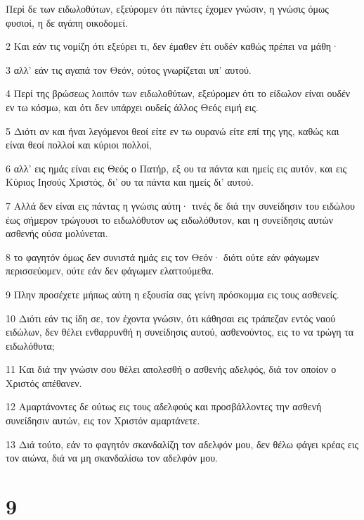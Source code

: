 \par Περί δε των ειδωλοθύτων, εξεύρομεν ότι πάντες έχομεν γνώσιν, η γνώσις όμως φυσιοί, η δε αγάπη οικοδομεί.
\par 2 Και εάν τις νομίζη ότι εξεύρει τι, δεν έμαθεν έτι ουδέν καθώς πρέπει να μάθη·
\par 3 αλλ' εάν τις αγαπά τον Θεόν, ούτος γνωρίζεται υπ' αυτού.
\par 4 Περί της βρώσεως λοιπόν των ειδωλοθύτων, εξεύρομεν ότι το είδωλον είναι ουδέν εν τω κόσμω, και ότι δεν υπάρχει ουδείς άλλος Θεός ειμή εις.
\par 5 Διότι αν και ήναι λεγόμενοι θεοί είτε εν τω ουρανώ είτε επί της γης, καθώς και είναι θεοί πολλοί και κύριοι πολλοί,
\par 6 αλλ' εις ημάς είναι εις Θεός ο Πατήρ, εξ ου τα πάντα και ημείς εις αυτόν, και εις Κύριος Ιησούς Χριστός, δι' ου τα πάντα και ημείς δι' αυτού.
\par 7 Αλλά δεν είναι εις πάντας η γνώσις αύτη· τινές δε διά την συνείδησιν του ειδώλου έως σήμερον τρώγουσι το ειδωλόθυτον ως ειδωλόθυτον, και η συνείδησις αυτών ασθενής ούσα μολύνεται.
\par 8 το φαγητόν όμως δεν συνιστά ημάς εις τον Θεόν· διότι ούτε εάν φάγωμεν περισσεύομεν, ούτε εάν δεν φάγωμεν ελαττούμεθα.
\par 9 Πλην προσέχετε μήπως αύτη η εξουσία σας γείνη πρόσκομμα εις τους ασθενείς.
\par 10 Διότι εάν τις ίδη σε, τον έχοντα γνώσιν, ότι κάθησαι εις τράπεζαν εντός ναού ειδώλων, δεν θέλει ενθαρρυνθή η συνείδησις αυτού, ασθενούντος, εις το να τρώγη τα ειδωλόθυτα;
\par 11 Και διά την γνώσιν σου θέλει απολεσθή ο ασθενής αδελφός, διά τον οποίον ο Χριστός απέθανεν.
\par 12 Αμαρτάνοντες δε ούτως εις τους αδελφούς και προσβάλλοντες την ασθενή συνείδησιν αυτών, εις τον Χριστόν αμαρτάνετε.
\par 13 Διά τούτο, εάν το φαγητόν σκανδαλίζη τον αδελφόν μου, δεν θέλω φάγει κρέας εις τον αιώνα, διά να μη σκανδαλίσω τον αδελφόν μου.

\chapter{9}


